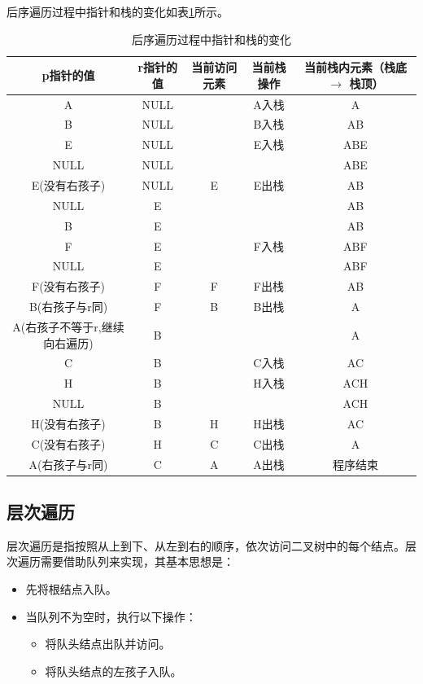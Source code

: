 \documentclass[lang=cn,newtx,10pt,scheme=chinese]{../elegantbook}
\begin{document}
后序遍历过程中指针和栈的变化如表\ref{tab:postorder_stack}所示。
\begin{table}[h!]
  \centering
  \caption{后序遍历过程中指针和栈的变化}
  \begin{tabular}{|c|c|c|c|c|}
  \hline
  \textbf{p指针的值} & \textbf{r指针的值} & \textbf{当前访问元素} & \textbf{当前栈操作} & \textbf{当前栈内元素（栈底 $\to$ 栈顶）} \\ \hline
  A & NULL &  & A入栈 & A \\ \hline
  B & NULL &  & B入栈 & AB \\ \hline
  E & NULL &  & E入栈 & ABE \\ \hline
  NULL & NULL &  &  & ABE \\ \hline
  E(没有右孩子) & NULL & E & E出栈 & AB \\ \hline
  NULL & E &  &  & AB \\ \hline
  B & E &  &  & AB \\ \hline
  F & E &  & F入栈 & ABF \\ \hline
  NULL & E &  &  & ABF \\ \hline
  F(没有右孩子) & F & F & F出栈 & AB \\ \hline
  B(右孩子与r同) & F & B & B出栈 & A \\ \hline
  A(右孩子不等于r,继续向右遍历) & B &  &  & A \\ \hline
  C & B &  & C入栈 & AC \\ \hline
  H & B &  & H入栈 & ACH \\ \hline
  NULL & B &  &  & ACH \\ \hline
  H(没有右孩子) & B & H & H出栈 & AC \\ \hline
  C(没有右孩子) & H & C & C出栈 & A \\ \hline
  A(右孩子与r同) & C & A & A出栈 & 程序结束 \\ \hline
  \end{tabular}
  \label{tab:postorder_stack}
  \end{table}
\subsection{层次遍历}

层次遍历是指按照从上到下、从左到右的顺序，依次访问二叉树中的每个结点。层次遍历需要借助队列来实现，其基本思想是：

\begin{itemize}
  \item 先将根结点入队。
  \item 当队列不为空时，执行以下操作：
  \begin{itemize}
    \item 将队头结点出队并访问。
    \item 将队头结点的左孩子入队。
  \end{itemize}
\end{itemize}
\end{document}
